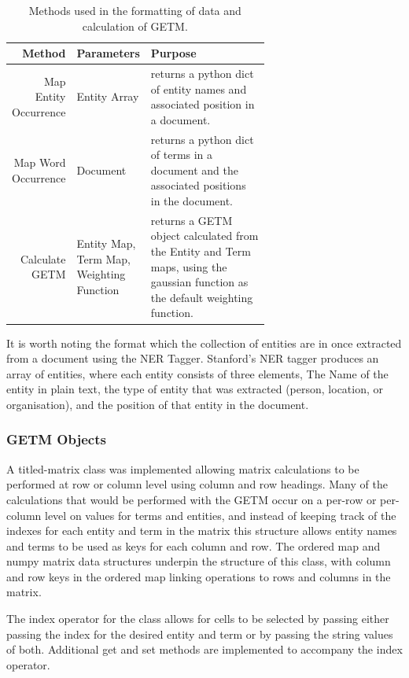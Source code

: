 \documentclass[10pt]{report}
\begin{document}
\renewcommand{\baselinestretch}{1.0}\normalsize
\renewcommand{\arraystretch}{2.0}
\begin{table}[h!]
  \begin{tabular}{ r | p{0.15\linewidth} | p{0.5\linewidth}}
  
  Method & Parameters &Purpose\\
    \hline
    Map Entity Occurrence & Entity Array & returns a python dict of entity names and associated position in a document.\\ 
    Map Word Occurrence & Document & returns a python dict of terms in a document and the associated positions in the document.\\
    Calculate GETM &Entity Map, Term Map, Weighting Function & returns a GETM object calculated from the Entity and Term maps, using the gaussian function as the default weighting function.\\
    
  \end{tabular}
  \caption{Methods used in the formatting of data and calculation of GETM.\label{tab:getm_methods}}
\end{table}
\renewcommand{\baselinestretch}{2.0}\normalsize
\renewcommand{\arraystretch}{1.0}

It is worth noting the format which the collection of entities are in once extracted from a document using the NER Tagger. Stanford's NER tagger produces an array of entities, where each entity consists of three elements, The Name of the entity in plain text, the type of entity that was extracted (person, location, or organisation), and the position of that entity in the document. 

\subsubsection{GETM Objects}
A titled-matrix class was implemented allowing matrix calculations to be performed at row or column level using column and row headings. Many of the calculations that would be performed with the GETM occur on a per-row or per-column level on values for terms and entities, and instead of keeping track of the indexes for each entity and term in the matrix this structure allows entity names and terms to be used as keys for each column and row. The ordered map and numpy matrix data structures underpin the structure of this class, with column and row keys in the ordered map linking operations to rows and columns in the matrix.

The index operator for the class allows for cells to be selected by passing either passing the index for the desired entity and term or by passing the string values of both. Additional get and set methods are implemented to accompany the index operator.
\end{document}
